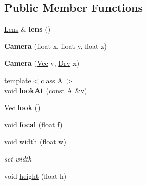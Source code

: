 \subsection*{Public Member Functions}
\begin{DoxyCompactItemize}
\item 
\hypertarget{classvsr_1_1_camera_a737a8f26e14d74398908e4338e8e76ec}{\hyperlink{structvsr_1_1_lens}{Lens} \& {\bfseries lens} ()}\label{classvsr_1_1_camera_a737a8f26e14d74398908e4338e8e76ec}

\item 
\hypertarget{classvsr_1_1_camera_a4fcce402ac01ff262442ddaf9e7a7e14}{{\bfseries Camera} (float x, float y, float z)}\label{classvsr_1_1_camera_a4fcce402ac01ff262442ddaf9e7a7e14}

\item 
\hypertarget{classvsr_1_1_camera_ab680bd22fe3540c00d4b369b03c8dabd}{{\bfseries Camera} (\hyperlink{namespacevsr_a0d061c30ac198a710a1b92dd8b343273}{Vec} v, \hyperlink{namespacevsr_a106201b887e3d76e1fa4e2b719f1c9cc}{Drv} x)}\label{classvsr_1_1_camera_ab680bd22fe3540c00d4b369b03c8dabd}

\item 
\hypertarget{classvsr_1_1_camera_aed0050506ba382a33d7d1f9de3babcfb}{{\footnotesize template$<$class A $>$ }\\void {\bfseries look\-At} (const A \&v)}\label{classvsr_1_1_camera_aed0050506ba382a33d7d1f9de3babcfb}

\item 
\hypertarget{classvsr_1_1_camera_a4a1d58d619ba62a0d081697463be1943}{\hyperlink{namespacevsr_a0d061c30ac198a710a1b92dd8b343273}{Vec} {\bfseries look} ()}\label{classvsr_1_1_camera_a4a1d58d619ba62a0d081697463be1943}

\item 
\hypertarget{classvsr_1_1_camera_adf0d78d4303273f001bb3feeaeaa8732}{void {\bfseries focal} (float f)}\label{classvsr_1_1_camera_adf0d78d4303273f001bb3feeaeaa8732}

\item 
\hypertarget{classvsr_1_1_camera_a649f9fe1b7f3a86b1d2fb9ca2cbdb4f2}{void \hyperlink{classvsr_1_1_camera_a649f9fe1b7f3a86b1d2fb9ca2cbdb4f2}{width} (float w)}\label{classvsr_1_1_camera_a649f9fe1b7f3a86b1d2fb9ca2cbdb4f2}

\begin{DoxyCompactList}\small\item\em set width \end{DoxyCompactList}\item 
\hypertarget{classvsr_1_1_camera_a9c0d8b30df1034e952087b2e428a76b2}{void \hyperlink{classvsr_1_1_camera_a9c0d8b30df1034e952087b2e428a76b2}{height} (float h)}\label{classvsr_1_1_camera_a9c0d8b30df1034e952087b2e428a76b2}


\end{DoxyCompactItemize}

